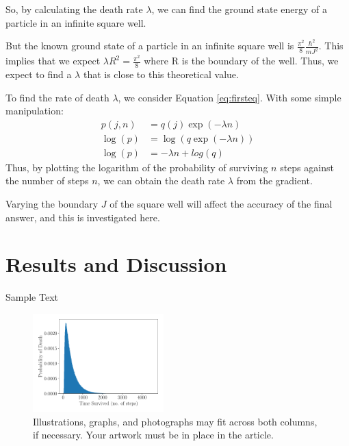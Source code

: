 \documentclass[journal]{IEEEtran}
\begin{document}
So, by calculating the death rate $\lambda$, we can find the ground state energy
of a particle in an infinite square well.

But the known ground state of a particle in an infinite square well is
$\frac{\pi^2}{8}\frac{\hbar^2}{mJ^2}$. This implies that we expect $\lambda
R^2=\frac{\pi^2}{8}$ where R is the boundary of the well. Thus, we expect to
find a $\lambda$ that is close to this theoretical value.


To find the rate of death $\lambda$, we consider Equation \ref{eq:firsteq}. With
some simple manipulation:
\begin{equation}
  \begin{split}
    p(j, n) & = q(j) \exp(-\lambda n)\\
    \log(p) & = \log(q \exp(-\lambda n)) \\
    \log(p) & = -\lambda n + log(q)
  \end{split}
  \nonumber
\end{equation}
Thus, by plotting the logarithm of the probability of surviving $n$ steps
against the number of steps $n$, we can obtain the death rate $\lambda$ from the
gradient.

Varying the boundary $J$ of the square well will affect the accuracy of the
final answer, and this is investigated here.


\section{Results and Discussion}

Sample Text

\begin{figure}[H]%
  \begin{center}
    \includegraphics[width=0.45\textwidth]{images/exp_plot.pdf}
    \caption{Illustrations, graphs, and photographs may fit across both columns, if necessary. Your artwork must be in place in the article.}
    \label{fig:exp_plot}
  \end{center}
\end{figure}
\end{document}
